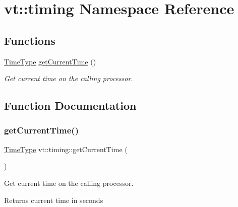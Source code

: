 \hypertarget{namespacevt_1_1timing}{}\section{vt\+:\+:timing Namespace Reference}
\label{namespacevt_1_1timing}
\subsection*{Functions}
\begin{DoxyCompactItemize}
\item 
\hyperlink{namespacevt_a2b9f28078dc309ad0706b69ded743e69}{Time\+Type} \hyperlink{namespacevt_1_1timing_adb71f74fee337dab5a317e58e7d35b1d}{get\+Current\+Time} ()
\begin{DoxyCompactList}\small\item\em Get current time on the calling processor. \end{DoxyCompactList}\end{DoxyCompactItemize}


\subsection{Function Documentation}
\mbox{\label{namespacevt_1_1timing_adb71f74fee337dab5a317e58e7d35b1d}} 
\subsubsection{\texorpdfstring{get\+Current\+Time()}{getCurrentTime()}}
{\footnotesize\ttfamily \hyperlink{namespacevt_a2b9f28078dc309ad0706b69ded743e69}{Time\+Type} vt\+::timing\+::get\+Current\+Time (\begin{DoxyParamCaption}{ }\end{DoxyParamCaption})}



Get current time on the calling processor. 

\begin{DoxyReturn}{Returns}
current time in seconds 
\end{DoxyReturn}
